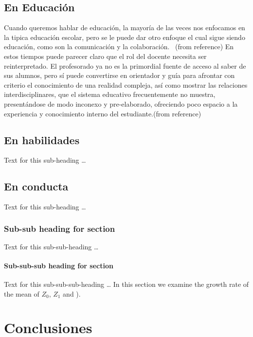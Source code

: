 \documentclass{bmcart}
\begin{document}
\subsection*{En Educación}
Cuando queremos hablar de educación, la mayoría de las veces nos enfocamos en la tipica educación escolar, pero se le puede dar otro enfoque el cual sigue siendo  educación, como son la comunicación y la colaboración.
\ (from reference\cite {sanchez2008videojuegos})
\newline
En estos tiempos puede parecer claro que el rol del docente necesita ser reinterpretado. El profesorado ya no es la primordial fuente de acceso al saber de sus alumnos, pero sí puede convertirse en orientador y guía para afrontar con criterio el conocimiento de una realidad compleja, así como mostrar las relaciones interdisciplinares, que el sistema educativo frecuentemente no muestra, presentándose de modo inconexo y pre-elaborado, ofreciendo poco espacio a la experiencia y conocimiento interno del estudiante.(from reference\cite{ruiz2012aprendiendo})
\subsection*{En habilidades}
Text for this sub-heading \ldots
\subsection*{En conducta}
Text for this sub-heading \ldots
\subsubsection*{Sub-sub heading for section}
Text for this sub-sub-heading \ldots
\paragraph*{Sub-sub-sub heading for section}
Text for this sub-sub-sub-heading \ldots
In this section we examine the growth rate of the mean of $Z_0$, $Z_1$ and  \cite{koon,khar,zvai,xjon,marg}).

\section*{Conclusiones}

\end{document}

